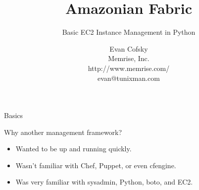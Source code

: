 \documentclass{beamer}
\title{Amazonian Fabric}
\subtitle{Basic EC2 Instance Management in Python}
\author{Evan Cofsky \\
Memrise, Inc. \\
http://www.memrise.com/ \\
evan@tunixman.com}
\begin{document}
\begin{frame}{Basics}

Why another management framework?

\begin{itemize}

\item Wanted to be up and running quickly.
\item Wasn't familiar with Chef, Puppet, or even cfengine.
\item Was very familiar with sysadmin, Python, boto, and EC2.

\end{itemize}

\end{frame}
\end{document}
